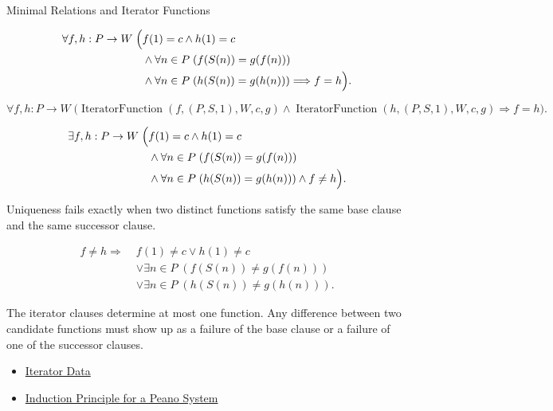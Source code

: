 \begin{topicbox}{Minimal Relations and Iterator Functions}
\begin{remark*}
\[
\begin{aligned}
\forall f,h:P\to W\;\Bigl(&
f(1)=c\land h(1)=c\\
&\land \forall n\in P\;(f(S(n))=g(f(n)))\\
&\land \forall n\in P\;(h(S(n))=g(h(n)))
\Longrightarrow f=h\Bigr).
\end{aligned}
\]
\end{remark*}

\begin{remark*}
\[
\forall f,h:P\to W\;
\bigl(\operatorname{IteratorFunction}(f,(P,S,1),W,c,g)
\land \operatorname{IteratorFunction}(h,(P,S,1),W,c,g)
\Longrightarrow f=h\bigr).
\]
\end{remark*}

\begin{remark*}
\[
\begin{aligned}
\exists f,h:P\to W\;\Bigl(&
f(1)=c\land h(1)=c\\
&\land \forall n\in P\;(f(S(n))=g(f(n)))\\
&\land \forall n\in P\;(h(S(n))=g(h(n)))
\land f\neq h\Bigr).
\end{aligned}
\]
\end{remark*}

\begin{remark*}
Uniqueness fails exactly when two distinct functions satisfy the same base
clause and the same successor clause.
\end{remark*}

\begin{remark*}
\[
\begin{aligned}
f\neq h
\Longrightarrow\;&
f(1)\neq c\lor h(1)\neq c\\
&\lor \exists n\in P\;(f(S(n))\neq g(f(n)))\\
&\lor \exists n\in P\;(h(S(n))\neq g(h(n))).
\end{aligned}
\]
\end{remark*}

\begin{remark*}[Interpretation]
The iterator clauses determine at most one function. Any difference between
two candidate functions must show up as a failure of the base clause or a
failure of one of the successor clauses.
\end{remark*}

\begin{remark*}[Dependencies]
\begin{itemize}
  \item \hyperref[def:iterator-data-on-peano-system]{Iterator Data}
  \item \hyperref[thm:induction-principle-for-peano-system]{Induction Principle for a Peano System}
\end{itemize}
\end{remark*}


\end{topicbox}
